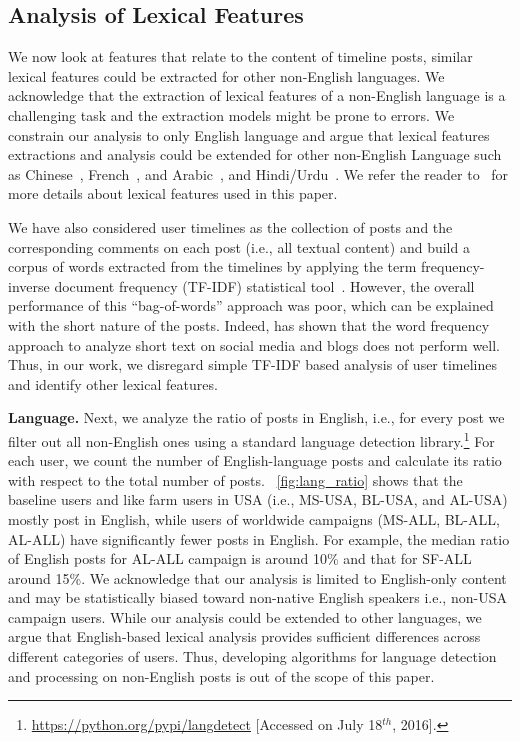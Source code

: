 \documentclass[twocolumn,10pt,letterpaper]{article}
\newcommand{\descr}[1]{\smallskip\noindent\textbf{#1}}
\begin{document}
\subsection{Analysis of Lexical Features}
\label{subsec:lexicalanalysis}
We now look at features that relate to the content of timeline posts, similar lexical features could be extracted for other non-English languages. We acknowledge that the extraction of lexical features of a non-English language is a challenging task and the extraction models might be prone to errors. We constrain our analysis to only English language and argue that lexical features extractions and analysis could be extended for other non-English Language such as Chinese~\cite{Zhang:2003:CLA,Zhang:2003:HCL:1119250.1119280}, French~\cite{Silberztein1989}, and Arabic~\cite{farghaly2009arabic}, and Hindi/Urdu~\cite{tiwary2008natural}. We refer the reader to~\cite{silberztein1997lexical} for more details about lexical features used in this paper. 

We have also considered user timelines as the collection of posts and the corresponding comments on each post (i.e., all textual content) and build a corpus of words extracted from the timelines by applying the term frequency-inverse document frequency (TF-IDF) statistical tool~\cite{Salton:tfidf}. However, the overall performance of this ``bag-of-words'' approach was poor, which can be explained with the short nature of the posts. Indeed, \cite{Hogenboom:2015} has shown that the word frequency approach to analyze short text on social media and blogs does not perform well. Thus, in our work, we disregard simple TF-IDF based analysis of user timelines and identify other lexical features.

\descr{Language.} Next, we analyze the ratio of posts in English, i.e., for every post we filter out all non-English ones using a standard language detection library.\footnote{\url{https://python.org/pypi/langdetect} [Accessed on July 18$^{th}$, 2016].} For each user, we count the number of English-language posts and calculate its ratio with respect to the total number of posts. \figurename~\ref{fig:lang_ratio} shows that the baseline users and like farm users in USA (i.e., MS-USA, BL-USA, and AL-USA) mostly post in English, while users of worldwide campaigns (MS-ALL, BL-ALL, AL-ALL) have significantly fewer posts in English. For example, the median ratio of English posts for AL-ALL campaign is around 10\% and that for SF-ALL around 15\%. We acknowledge that our analysis is limited to English-only content and may be statistically biased toward non-native English speakers i.e., non-USA campaign users. While our analysis could be extended to other languages, we argue that English-based lexical analysis provides sufficient differences across different categories of users. Thus, developing algorithms for language detection and processing on non-English posts is out of the scope of this paper. 
\end{document}
